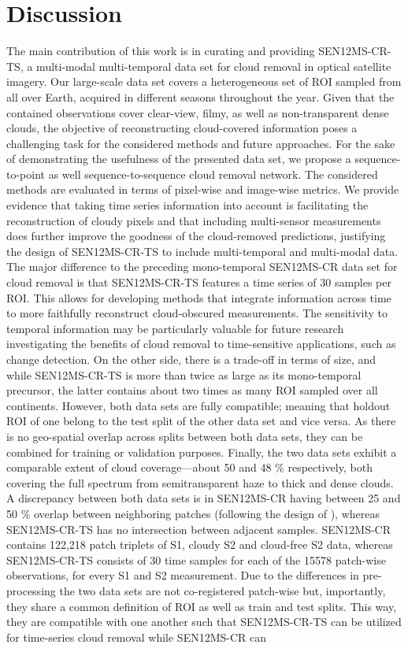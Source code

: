 \documentclass[journal]{IEEEtran}
\begin{document}
\section{Discussion} \label{discussion}

The main contribution of this work is in curating and providing SEN12MS-CR-TS, a multi-modal multi-temporal data set for cloud removal in optical satellite imagery. Our large-scale data set covers a heterogeneous set of ROI sampled from all over Earth, acquired in different seasons throughout the year. Given that the contained observations cover clear-view, filmy, as well as non-transparent dense clouds, the objective of reconstructing cloud-covered information poses a challenging task for the considered methods and future approaches. For the sake of demonstrating the usefulness of the presented data set, we propose a sequence-to-point as well sequence-to-sequence cloud removal network. The considered methods are evaluated in terms of pixel-wise and image-wise metrics. We provide evidence that taking time series information into account is facilitating the reconstruction of cloudy pixels and that including multi-sensor measurements does further improve the goodness of the cloud-removed predictions, justifying the design of SEN12MS-CR-TS to include multi-temporal and multi-modal data. The major difference to the preceding mono-temporal SEN12MS-CR data set \cite{ebel2020cloud} for cloud removal is that SEN12MS-CR-TS features a time series of 30 samples per ROI. This allows for developing methods that integrate information across time to more faithfully reconstruct cloud-obscured measurements. The sensitivity to temporal information may be particularly valuable for future research investigating the benefits of cloud removal to time-sensitive applications, such as change detection. On the other side, there is a trade-off in terms of size, and while SEN12MS-CR-TS is more than twice as large as its mono-temporal precursor, the latter contains about two times as many ROI sampled over all continents. However, both data sets are fully compatible; meaning that holdout ROI of one belong to the test split of the other data set and vice versa. As there is no geo-spatial overlap across splits between both data sets, they can be combined for training or validation purposes. Finally, the two data sets exhibit a comparable extent of cloud coverage---about 50 and 48 \% respectively, both covering the full spectrum from semitransparent haze to thick and dense clouds. A discrepancy between both data sets is in SEN12MS-CR having between 25 and 50 \% overlap between neighboring patches (following the design of \cite{schmitt2019sen12ms}), whereas SEN12MS-CR-TS has no intersection between adjacent samples. SEN12MS-CR contains 122,218 patch triplets of S1, cloudy S2 and cloud-free S2 data, whereas SEN12MS-CR-TS consists of 30 time samples for each of the 15578 patch-wise observations, for every S1 and S2 measurement. Due to the differences in pre-processing the two data sets are not co-registered patch-wise but, importantly, they share a common definition of ROI as well as train and test splits. This way, they are compatible with one another such that SEN12MS-CR-TS can be utilized for time-series cloud removal while SEN12MS-CR can 
\end{document}
